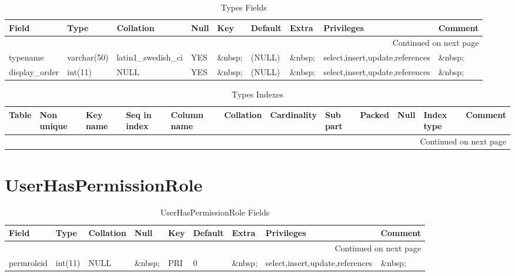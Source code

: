 \documentclass[tablesignature,landscape]{scrartcl}
\begin{document}
\begin{longtable}{|l|l|l|l|l|l|l|l|l|}
\caption{Types Fields} \label{tbl:typesfields}\\
\hline
 Field             &  Type         &  Collation                &  Null     &  Key      &  Default  &  Extra              &  Privileges                       &  Comment \\
\hline
\endhead
\hline\multicolumn{9}{r}{Continued on next page}\
\endfoot
\endlastfoot
\hline
 typeid            &  int(11)      &  NULL                     &  \&nbsp;  &  PRI      &  (NULL)   &  auto\_{}increment  &  select,insert,update,references  &  \&nbsp;  \\
 typename          &  varchar(50)  &  latin1\_{}swedish\_{}ci  &  YES      &  \&nbsp;  &  (NULL)   &  \&nbsp;            &  select,insert,update,references  &  \&nbsp;  \\
 display\_{}order  &  int(11)      &  NULL                     &  YES      &  \&nbsp;  &  (NULL)   &  \&nbsp;            &  select,insert,update,references  &  \&nbsp;  \\
\hline
\end{longtable}


\begin{longtable}{|l|l|l|l|l|l|l|l|l|l|l|l|}
\caption{Types Indexes} \label{tbl:typesindexes}\\
\hline
 Table  &  Non unique  &  Key name  &  Seq in index  &  Column name  &  Collation  &  Cardinality  &  Sub part  &  Packed  &  Null     &  Index type  &  Comment \\
\hline
\endhead
\hline\multicolumn{12}{r}{Continued on next page}\
\endfoot
\endlastfoot
\hline
 Types  &           0  &  PRIMARY   &             1  &  typeid       &  A          &           16  &  (NULL)    &  (NULL)  &  \&nbsp;  &  BTREE       &  \&nbsp;  \\
\hline
\end{longtable}
\section{UserHasPermissionRole}
\label{sec-34}


\begin{longtable}{|l|l|l|l|l|l|l|l|l|}
\caption{UserHasPermissionRole Fields} \label{tbl:userhaspermissionrolefields}\\
\hline
 Field       &  Type         &  Collation                &  Null     &  Key  &  Default  &  Extra    &  Privileges                       &  Comment \\
\hline
\endhead
\hline\multicolumn{9}{r}{Continued on next page}\
\endfoot
\endlastfoot
\hline
 badgeid     &  varchar(15)  &  latin1\_{}swedish\_{}ci  &  \&nbsp;  &  PRI  &  \&nbsp;  &  \&nbsp;  &  select,insert,update,references  &  \&nbsp;  \\
 permroleid  &  int(11)      &  NULL                     &  \&nbsp;  &  PRI  &  0        &  \&nbsp;  &  select,insert,update,references  &  \&nbsp;  \\
\hline
\end{longtable}
\end{document}
